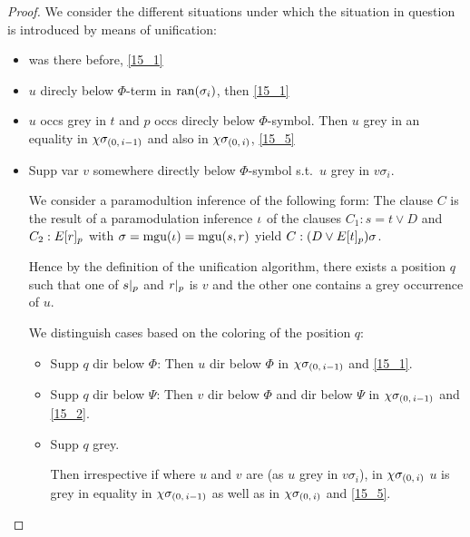 \documentclass[,%
	draft=false,%
	numbers=noendperiod
	12pt,
	a4paper,
	oneside,%
	openany,
]{memoir}
\newcommand{\inv}{\ensuremath{\chi}}
\begin{document}
\begin{proof}
	We consider the different situations under which the situation in question is introduced by means of unification: 
	\begin{itemize}
		\item
			was there before, \ref{15_1}

		\item
			$u$ direcly below $\Phi$-term in $\operatorname{ran}(\sigma_i)$, then \ref{15_1}

		\item
			$u$ occs grey in $t$ and $p$ occs direcly below $\Phi$-symbol.
			Then $u$ grey in an equality in $\inv\sigmazmi$ and also in $\inv\sigmazi$, \ref{15_5}

		\item
			Supp var $v$ somewhere directly below $\Phi$-symbol s.t.\ $u$ grey in $v\sigma_i$.

			We consider a paramodultion inference of the following form:
			The clause $C$ is the result of a paramodulation inference\nolinebreak{} $\iota$ of
			the clauses $C_1: s=t \lor D$ and $C_2: E{[r]_{p}}$ with $\sigma=\operatorname{mgu}(\iota)=\operatorname{mgu}(s, r)$ yield $C: (D\lor E{[t]_{p}})\sigma$.

			Hence by the definition of the unification algorithm, there exists a position $q$ such that one of $s|_{p}$ and $r|_{p}$ is $v$ and the other one contains a grey occurrence of $u$.

			We distinguish cases based on the coloring of the position $q$:

			\begin{itemize}
				\item Supp $q$ dir below $\Phi$: Then $u$ dir below $\Phi$ in $\inv\sigmazmi$ and \ref{15_1}.
				\item Supp $q$ dir below $\Psi$: Then $v$ dir below $\Phi$ and dir below $\Psi$ in $\inv\sigmazmi$ and \ref{15_2}.
				\item Supp $q$ grey.

					Then irrespective if where $u$ and $v$ are (as $u$ grey in $v\sigma_i$), in $\inv\sigmazi$ $u$ is grey in equality in $\inv\sigmazmi$ as well as in $\inv\sigmazi$ and \ref{15_5}.
					\qedhere
			\end{itemize}
	\end{itemize}
\end{proof}
\cbend
\end{document}
